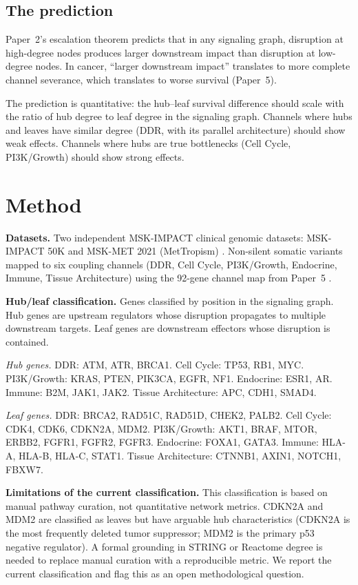 \documentclass[11pt]{article}
\begin{document}
\subsection{The prediction}

Paper~2's escalation theorem predicts that in any signaling graph,
disruption at high-degree nodes produces larger downstream impact
than disruption at low-degree nodes. In cancer, ``larger downstream
impact'' translates to more complete channel severance, which
translates to worse survival (Paper~5).

The prediction is quantitative: the hub--leaf survival difference
should scale with the ratio of hub degree to leaf degree in the
signaling graph. Channels where hubs and leaves have similar
degree (DDR, with its parallel architecture) should show weak
effects. Channels where hubs are true bottlenecks (Cell Cycle,
PI3K/Growth) should show strong effects.

\section{Method}
\label{sec:method}

\textbf{Datasets.}
Two independent MSK-IMPACT clinical genomic datasets:
MSK-IMPACT 50K \cite{Bandlamudi2024} and MSK-MET 2021
(MetTropism) \cite{Nguyen2022}. Non-silent somatic variants
mapped to six coupling channels (DDR, Cell Cycle, PI3K/Growth,
Endocrine, Immune, Tissue Architecture) using the 92-gene
channel map from Paper~5 \cite{McCarthy2026e}.

\textbf{Hub/leaf classification.}
Genes classified by position in the signaling graph.
Hub genes are upstream regulators whose disruption propagates
to multiple downstream targets. Leaf genes are downstream
effectors whose disruption is contained.

\emph{Hub genes.}
DDR: ATM, ATR, BRCA1.
Cell Cycle: TP53, RB1, MYC.
PI3K/Growth: KRAS, PTEN, PIK3CA, EGFR, NF1.
Endocrine: ESR1, AR.
Immune: B2M, JAK1, JAK2.
Tissue Architecture: APC, CDH1, SMAD4.

\emph{Leaf genes.}
DDR: BRCA2, RAD51C, RAD51D, CHEK2, PALB2.
Cell Cycle: CDK4, CDK6, CDKN2A, MDM2.
PI3K/Growth: AKT1, BRAF, MTOR, ERBB2, FGFR1, FGFR2, FGFR3.
Endocrine: FOXA1, GATA3.
Immune: HLA-A, HLA-B, HLA-C, STAT1.
Tissue Architecture: CTNNB1, AXIN1, NOTCH1, FBXW7.

\textbf{Limitations of the current classification.}
This classification is based on manual pathway curation, not
quantitative network metrics. CDKN2A and MDM2 are classified as
leaves but have arguable hub characteristics (CDKN2A is the most
frequently deleted tumor suppressor; MDM2 is the primary p53
negative regulator). A formal grounding in STRING \cite{Szklarczyk2023}
or Reactome \cite{Jassal2020} degree is needed to replace manual
curation with a reproducible metric. We report the current
classification and flag this as an open methodological question.
\end{document}
